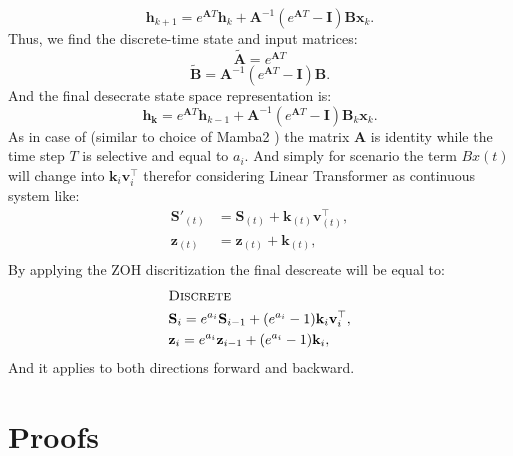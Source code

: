 {\begin{equation}
\mathbf{h}_{k+1} = e^{\mathbf{A}T} \mathbf{h}_k + \mathbf{A}^{-1} \left( e^{\mathbf{A}T} - \mathbf{I} \right) \mathbf{B}\mathbf{x}_k.
\end{equation}
Thus, we find the discrete-time state and input matrices:
\begin{equation}
\mathbf{\tilde{A}} = e^{\mathbf{A}T}
\end{equation}
\begin{equation}
\mathbf{\tilde{B}} = \mathbf{A}^{-1} \left( e^{\mathbf{A}T} - \mathbf{I} \right) \mathbf{B}.
\end{equation}
And the final desecrate state space representation is:
\begin{equation}
\mathbf{h_k} = e^{\mathbf{A}T}\mathbf{h}_{k-1} +  \mathbf{A}^{-1} \left( e^{\mathbf{A}T} - \mathbf{I} \right) \mathbf{B}_k\mathbf{x}_k.
\end{equation}
As in case of \lions (similar to choice of Mamba2 \cite{mamba2}) the matrix $\mathbf{A}$ is identity while the time step $T$ is selective and equal to $a_i$. And simply for \lions scenario the term $Bx(t)$ will change into $\mathbf{k}_i\mathbf{v}^\top_i$ therefor considering Linear Transformer as continuous system like:
\begin{align}
\label{eq:recurscale22}
    \mathbf{S}'_{(t)} &=  \mathbf{S}_{(t)} + \mathbf{k}_{(t)}\mathbf{v}_{(t)}^{\top}, \\
    \mathbf{z}_{(t)} & = \mathbf{z}_{(t)} + {\mathbf{k}_{(t)}}, \\
\end{align}
By applying the ZOH discritization the final descreate \lions will be equal to:
 \begin{align}  
    \hspace{4mm}  & \hspace{-0.4cm}  \textsc{Discrete } \notag \\
      & \hspace{-0.4cm}  \mathbf{S}_{i} = e^{a_i}\mathbf{S}_{i-1}+ (e^{a_i}-1)\mathbf{k}_{i}\mathbf{v}_{i}^{\top},  \\
     &\hspace{-0.4cm}  \mathbf{z}_{i} =  e^{a_i}\mathbf{z}_{i-1} + (e^{a_i}-1)\mathbf{k}_{i}, 
    \end{align}
    And it applies to both directions forward and backward.
}

\section{Proofs}
\label{app:proofs}

